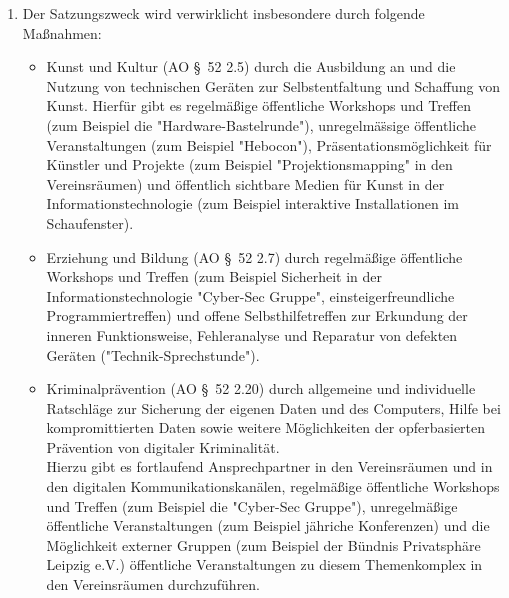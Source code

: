 \documentclass[10pt,a4paper]{scrartcl}
\newcommand{\qs}[1]{"#1"}
\begin{document}
\begin{enumerate}
\item 	Der Satzungszweck wird verwirklicht insbesondere durch folgende Ma{\ss}nahmen:
	\begin{itemize}
		\item	Kunst und Kultur (AO \S\ 52 2.5) durch die Ausbildung an und die Nutzung von technischen Ger{\"a}ten zur
				Selbstentfaltung und Schaffung von Kunst. Hierf{\"u}r gibt es re\-gel\-m{\"a}{\ss}ige {\"o}ffent\-liche Workshops und Treffen
				(zum Beispiel die \qs{Hard\-ware-Bastel\-runde}), unregelm{\"a}{\"ss}ige {\"o}ffent\-liche Veran\-stal\-tungen (zum Beispiel
				"Hebocon"), Pr{\"a}\-senta\-tions\-m{\"o}glichkeit f{\"u}r K{\"u}nstler und Projekte (zum Beispiel \qs{Projektionsmapping}
				in den Vereins\-r{\"a}umen) und {\"o}ffent\-lich sichtbare Medien f{\"u}r Kunst in der Infor\-mations\-techno\-logie
				(zum Beispiel interaktive Installationen im Schaufenster).
		\item	Erziehung und Bildung (AO \S\ 52 2.7) durch regel\-m{\"a}{\ss}ige {\"o}ffent\-liche Workshops und Treffen (zum Beispiel
				Sicherheit in der Informationstechnologie \qs{Cyber-Sec Gruppe}, einsteigerfreundliche Programmiertreffen)
				und offene Selbsthilfetreffen zur Erkun\-dung der inneren Funktionsweise, Fehleranalyse und Reparatur von
				defekten Ge\-r{\"a}ten (\qs{Tech\-nik-Sprech\-stunde}).
		\item	Kriminalpr{\"a}vention (AO \S\ 52 2.20) durch allgemeine und individuelle Ratschl{\"a}ge zur Sicherung der eigenen
				Daten und des Computers, Hilfe bei kompromittierten Daten sowie weitere M{\"o}glichkeiten der
				opferbasierten Pr{\"a}vention von digitaler Kriminalit{\"a}t.\\
				Hierzu gibt es fortlaufend Ansprechpartner in den Vereinsr{\"a}umen und in den digitalen Kommunikationskan{\"a}len,
				regelm{\"a}{\ss}ige {\"o}ffentliche Workshops und Treffen (zum Beispiel die \qs{Cyber-Sec Gruppe}), unregelm{\"a}{\ss}ige
				{\"o}ffentliche Veranstaltungen (zum Beispiel j{\"a}hriche Konferenzen) und die M{\"o}glichkeit externer Gruppen
				(zum Beispiel der B{\"u}ndnis Privatsph{\"a}re Leipzig e.V.) {\"o}ffentliche Veranstaltungen zu diesem Themenkomplex
				in den Vereinsr{\"a}umen durchzuf{\"u}hren.\\
	\end{itemize}
\end{enumerate}
%
%
\end{document}
